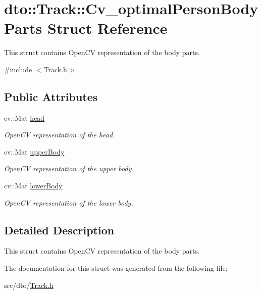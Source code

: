 \hypertarget{structdto_1_1_track_1_1_cv__optimal_person_body_parts}{}\section{dto\+:\+:Track\+:\+:Cv\+\_\+optimal\+Person\+Body\+Parts Struct Reference}
\label{structdto_1_1_track_1_1_cv__optimal_person_body_parts}


This struct contains Open\+CV representation of the body parts.  




{\ttfamily \#include $<$Track.\+h$>$}

\subsection*{Public Attributes}
\begin{DoxyCompactItemize}
\item 
\mbox{\label{structdto_1_1_track_1_1_cv__optimal_person_body_parts_a7d9cc61d48465312063a2a46e70c6649}} 
cv\+::\+Mat \mbox{\hyperlink{structdto_1_1_track_1_1_cv__optimal_person_body_parts_a7d9cc61d48465312063a2a46e70c6649}{head}}
\begin{DoxyCompactList}\small\item\em Open\+CV representation of the head. \end{DoxyCompactList}\item 
\mbox{\label{structdto_1_1_track_1_1_cv__optimal_person_body_parts_a092af0bb4e7357d920c4f185d172ad17}} 
cv\+::\+Mat \mbox{\hyperlink{structdto_1_1_track_1_1_cv__optimal_person_body_parts_a092af0bb4e7357d920c4f185d172ad17}{upper\+Body}}
\begin{DoxyCompactList}\small\item\em Open\+CV representation of the upper body. \end{DoxyCompactList}\item 
\mbox{\label{structdto_1_1_track_1_1_cv__optimal_person_body_parts_a55fe40d347f12b70882bbe407cd518c8}} 
cv\+::\+Mat \mbox{\hyperlink{structdto_1_1_track_1_1_cv__optimal_person_body_parts_a55fe40d347f12b70882bbe407cd518c8}{lower\+Body}}
\begin{DoxyCompactList}\small\item\em Open\+CV representation of the lower body. \end{DoxyCompactList}\end{DoxyCompactItemize}


\subsection{Detailed Description}
This struct contains Open\+CV representation of the body parts. 

The documentation for this struct was generated from the following file\+:\begin{DoxyCompactItemize}
\item 
src/dto/\mbox{\hyperlink{_track_8h}{Track.\+h}}\end{DoxyCompactItemize}
